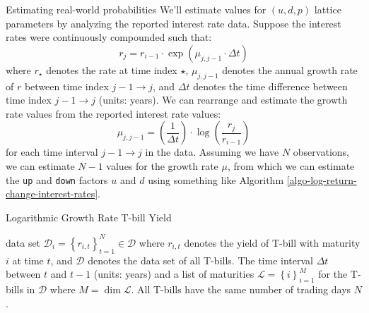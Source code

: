 \documentclass[11pt]{article}
\makeatletter
\theoremstyle{definition}
\renewcommand\subsubsection{\@startsection
	{subsubsection}{2}{0mm}
	{-0.05in}
	{-0.5\baselineskip}
	{\normalfont\normalsize\itshape\bfseries}}
\makeatother
\begin{document}
\subsubsection{Estimating real-world probabilities}
We'll estimate values for $(u,d,p)$ lattice parameters by analyzing the reported interest rate data. 
Suppose the interest rates were continuously compounded such that:
\begin{equation}
r_{j} = r_{i-1}\cdot\exp\left(\mu_{j,j-1}\cdot\Delta{t}\right)
\end{equation}
where $r_{\star}$ denotes the rate at time index $\star$, $\mu_{j,j-1}$ denotes the annual growth rate of $r$ between time index 
$j-1\rightarrow{j}$, and $\Delta{t}$ denotes the time difference between time index $j - 1\rightarrow{j}$ (units: years). 
We can rearrange and estimate the growth rate values from the reported interest rate values:
\begin{equation}
\mu_{j,j-1} = \left(\frac{1}{\Delta{t}}\right)\cdot\log\left(\frac{r_{j}}{r_{i-1}}\right)
\end{equation}
for each time interval $j - 1\rightarrow{j}$ in the data. Assuming we have $N$ observations, we can estimate $N-1$ values for the 
growth rate $\mu$, from which we can estimate the \texttt{up} and \texttt{down} factors $u$ and $d$ using something like Algorithm \ref{algo-log-return-change-interest-rates}.

\begin{algorithm}[h]
    \caption{Logarithmic Growth Rate T-bill Yield}\label{algo-log-return-change-interest-rates}
    \begin{algorithmic}[1]

        \Statex
        \Require data set $\mathcal{D}_{i} = \left\{r_{i,t}\right\}_{t=1}^{N}\in\mathcal{D}$ where $r_{i,t}$ denotes the yield of T-bill with maturity $i$ at time $t$, 
		and $\mathcal{D}$ denotes the data set of all T-bills.
        \Require The time interval $\Delta{t}$ between $t$ and $t-1$ (units: years) and a list of maturities $\mathcal{L} = \left\{i\right\}_{i=1}^{M}$ for the T-bills in $\mathcal{D}$ where $M = \dim\mathcal{L}$.
		\Require All T-bills have the same number of trading days $N$.
     
        \Statex
            \EndFor
        \EndFor
        \Statex
		\EndProcedure
    \end{algorithmic}
\end{algorithm}
\end{document}
